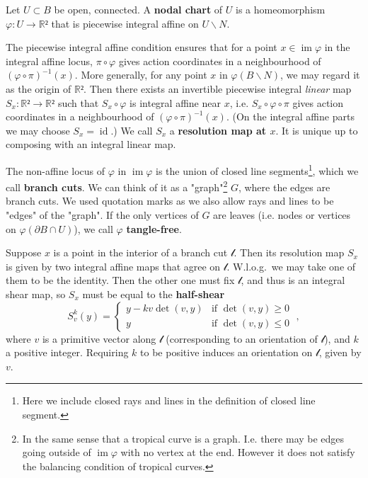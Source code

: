 \documentclass[12pt,a4paper,abstract=true,draft]{scrartcl}
\DeclareMathOperator{\id}{id}
\DeclareMathOperator{\im}{im}
\begin{document}
\begin{definition}
  Let $U ⊂ B$ be open, connected.
  A \textbf{nodal chart} of $U$ is a homeomorphism $φ \colon U → ℝ²$ that is piecewise integral affine on $U ∖ N$.
\end{definition}

The piecewise integral affine condition ensures that for a point $x ∈ \im φ$ in the integral affine locus, $π ∘ φ$ gives action coordinates in a neighbourhood of $(φ ∘ π)^{-1}(x)$.
More generally, for any point $x$ in $φ(B ∖ N)$, we may regard it as the origin of $ℝ²$.
Then there exists an invertible piecewise integral \emph{linear} map $S_x\colon ℝ² → ℝ²$ such that $S_x ∘ φ$ is integral affine near $x$, i.e. $S_x ∘ φ ∘ π$ gives action coordinates in a neighbourhood of $(φ ∘ π)^{-1}(x)$. (On the integral affine parts we may choose $S_x = \id$.)
We call $S_x$ a \textbf{resolution map at $x$}.
It is unique up to composing with an integral linear map.

The non-affine locus of $φ$ in $\im φ$ is the union of closed line segments\footnote{Here we include closed rays and lines in the definition of closed line segment.}, which we call \textbf{branch cuts}.
We can think of it as a "graph"\footnote{In the same sense that a tropical curve is a graph. I.e. there may be edges going outside of $\im φ$ with no vertex at the end. However it does not satisfy the balancing condition of tropical curves.} $G$, where the edges are branch cuts.
We used quotation marks as we also allow rays and lines to be "edges" of the "graph".
If the only vertices of $G$ are leaves (i.e. nodes or vertices on $φ(∂B ∩ U)$), we call $φ$ \textbf{tangle-free}.

\begin{remark}
  \label{rem:bc_resolution}
  Suppose $x$ is a point in the interior of a branch cut $𝓁$.
  Then its resolution map $S_x$ is given by two integral affine maps that agree on $𝓁$.
W.l.o.g.\ we may take one of them to be the identity.
Then the other one must fix $𝓁$, and thus is an integral shear map, so $S_x$ must be equal to the \textbf{half-shear}
\begin{equation}
  \label{eq:half_shear}
  S_v^k(y) = \begin{cases}
    y - k v\det(v,y) & \text{if } \det(v,y) ≥ 0 \\
    y & \text{if } \det(v,y) ≤ 0
  \end{cases} \; ,
\end{equation}
where $v$ is a primitive vector along $𝓁$ (corresponding to an orientation of $𝓁$), and $k$ a positive integer.
Requiring $k$ to be positive induces an orientation on $𝓁$, given by $v$.
\end{remark}
\end{document}
